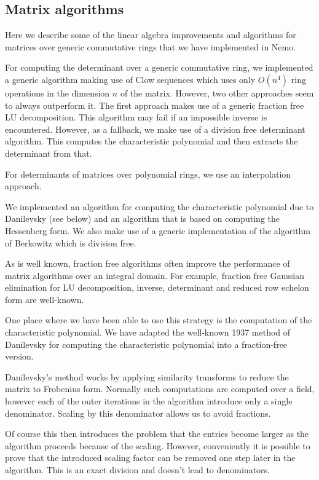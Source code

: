 \documentclass{sig-alternate-05-2015}
\begin{document}
\subsection{Matrix algorithms}

Here we describe some of the linear algebra improvements and algorithms for matrices
over generic commutative rings that we have implemented in Nemo.

For computing the determinant over a generic commutative ring, we implemented a generic
algorithm making use of Clow sequences \cite{clow} which uses only $O(n^4)$ ring operations
in the dimension $n$ of the matrix. However, two other approaches seem to always outperform
it. The first approach makes use of a generic fraction free LU decomposition. This algorithm
may fail if an impossible inverse is encountered. However, as a fallback, we make use of a
division free determinant algorithm. This computes the characteristic polynomial and then
extracts the determinant from that.

For determinants of matrices over polynomial rings, we use an interpolation approach.

We implemented an algorithm for computing the characteristic polynomial due to
Danilevsky (see below) and an algorithm that is based on computing the Hessenberg
form. We also make use of a generic implementation of the algorithm of Berkowitz which
is division free. 

As is well known, fraction free algorithms often improve the performance of matrix
algorithms over an integral domain. For example, fraction free Gaussian elimination
for LU decomposition, inverse, determinant and reduced row echelon form
are well-known.

One place where we have been able to use this strategy is the computation
of the characteristic polynomial. We have adapted the well-known 1937 method
of Danilevsky for computing the characteristic polynomial into a fraction-free
version.

Danilevsky's method works by applying similarity transforms to reduce the
matrix to Frobenius form. Normally such computations are computed over a
field, however each of the outer iterations in the algorithm introduce only
a single denominator. Scaling by this denominator allows us to avoid
fractions.

Of course this then introduces the problem that the entries become larger
as the algorithm proceeds because of the scaling. However, conveniently
it is possible to prove that the introduced scaling factor can be removed 
one step later in the algorithm. This is an exact division and doesn't
lead to denominators.
\end{document}
